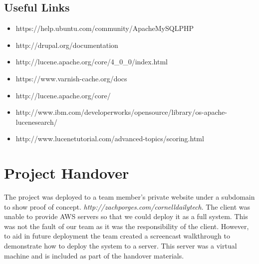 \documentclass[10pt]{article} %
\begin{document}
\subsection{Useful Links}

\begin{itemize}
\item https://help.ubuntu.com/community/ApacheMySQLPHP
\item http://drupal.org/documentation
\item http://lucene.apache.org/core/4\_0\_0/index.html
\item https://www.varnish-cache.org/docs
\item http://lucene.apache.org/core/
\item http://www.ibm.com/developerworks/opensource/library/os-apache-lucenesearch/
\item http://www.lucenetutorial.com/advanced-topics/scoring.html
\end{itemize}

\section{Project Handover}

The project was deployed to a team member's private website under a subdomain to show proof of concept. \emph{http://zachporges.com/cornelldailytech}. The client was unable to provide AWS servers so that we could deploy it as a full system. This was not the fault of our team as it was the responsibility of the client. However, to aid in future deployment the team created a screencast walkthrough to demonstrate how to deploy the system to a server. This server was a virtual machine and is included as part of the handover materials.
\end{document}

